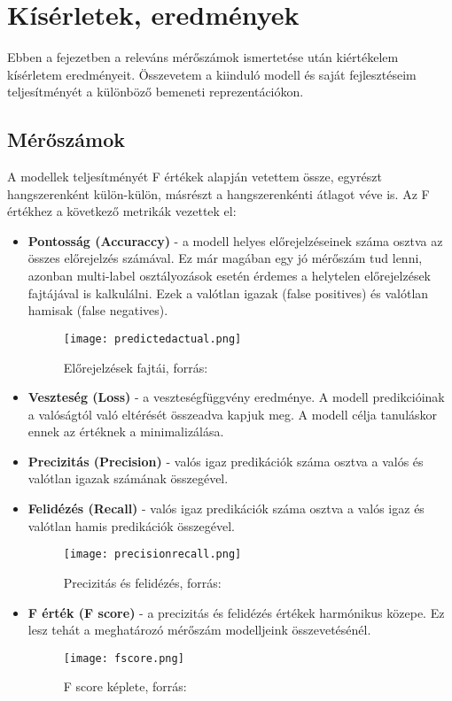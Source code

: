 \chapter{Kísérletek, eredmények} 
\label{ch:results}

Ebben a fejezetben a releváns mérőszámok ismertetése után kiértékelem kísérletem eredményeit. Összevetem a kiinduló modell és saját fejlesztéseim teljesítményét a különböző bemeneti reprezentációkon.

\section{Mérőszámok}

A modellek teljesítményét F értékek alapján vetettem össze, egyrészt hangszerenként külön-külön, másrészt a hangszerenkénti átlagot véve is. Az F értékhez a következő metrikák vezettek el:

\begin{itemize}
\item \textbf{Pontosság (Accuraccy)} - a modell helyes előrejelzéseinek száma osztva az összes előrejelzés számával. Ez már magában egy jó mérőszám tud lenni, azonban multi-label osztályozások esetén érdemes a helytelen előrejelzések fajtájával is kalkulálni. Ezek a valótlan igazak (false positives) és valótlan hamisak (false negatives).
\begin{figure}[H]
  \centering
  \texttt{[image: predictedactual.png]}
  \caption{Előrejelzések fajtái, forrás: \cite{fscore}}
\end{figure}

\item \textbf{Veszteség (Loss)} - a veszteségfüggvény eredménye. A modell predikcióinak a valóságtól való eltérését összeadva kapjuk meg. A modell célja tanuláskor ennek az értéknek a minimalizálása.
\item \textbf{Precizitás (Precision)} - valós igaz predikációk száma osztva a valós és valótlan igazak számának összegével.
\item \textbf{Felidézés (Recall)} - valós igaz predikációk száma osztva a valós igaz és valótlan hamis predikációk összegével.
\begin{figure}[H]
  \centering
  \texttt{[image: precisionrecall.png]}
  \caption{Precizitás és felidézés, forrás: \cite{fscore}}
\end{figure}
\item \textbf{F érték (F score)} - a precizitás és felidézés értékek harmónikus közepe. Ez lesz tehát a meghatározó mérőszám modelljeink összevetésénél. \cite{fscore}

\begin{figure}[H]
  \centering
  \texttt{[image: fscore.png]}
  \caption{F score képlete, forrás: \cite{fscore}}
\end{figure}
\end{itemize}



